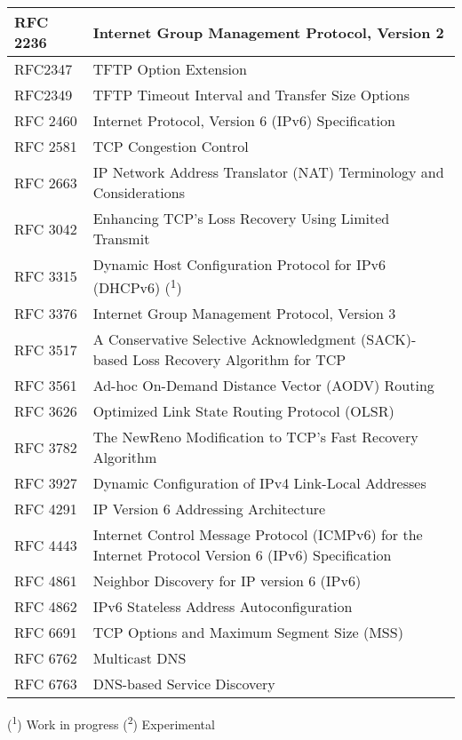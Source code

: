\begin{longtable}{ | l | p{15cm} | }
RFC 2236 &
Internet Group Management Protocol, Version 2 \\ \hline

RFC2347 &
TFTP Option Extension \\ \hline

RFC2349 &
TFTP Timeout Interval and Transfer Size Options \\ \hline

RFC 2460 &
Internet Protocol, Version 6 (IPv6) Specification \\ \hline

RFC 2581 &
TCP Congestion Control \\ \hline

RFC 2663 &
IP Network Address Translator (NAT) Terminology and Considerations \\ \hline

RFC 3042 &
Enhancing TCP's Loss Recovery Using Limited Transmit \\ \hline

RFC 3315 &
Dynamic Host Configuration Protocol for IPv6 (DHCPv6) (\textsuperscript{1}) \\ \hline

RFC 3376 &
Internet Group Management Protocol, Version 3 \\ \hline

RFC 3517 &
A Conservative Selective Acknowledgment (SACK)-based Loss Recovery Algorithm for TCP \\ \hline

RFC 3561 &
Ad-hoc On-Demand Distance Vector (AODV) Routing \\ \hline

RFC 3626 &
Optimized Link State Routing Protocol (OLSR) \\ \hline

RFC 3782 &
The NewReno Modification to TCP's Fast Recovery Algorithm \\ \hline

RFC 3927 &
Dynamic Configuration of IPv4 Link-Local Addresses \\ \hline

RFC 4291 &
IP Version 6 Addressing Architecture \\ \hline

RFC 4443 &
Internet Control Message Protocol (ICMPv6) for the Internet Protocol Version 6 (IPv6) Specification \\ \hline

RFC 4861 &
Neighbor Discovery for IP version 6 (IPv6) \\ \hline

RFC 4862 &
IPv6 Stateless Address Autoconfiguration \\ \hline

RFC 6691 &
TCP Options and Maximum Segment Size (MSS) \\ \hline

RFC 6762 &
Multicast DNS \\ \hline

RFC 6763 &
DNS-based Service Discovery \\ \hline

\end{longtable}

(\textsuperscript{1}) Work in progress
(\textsuperscript{2}) Experimental
